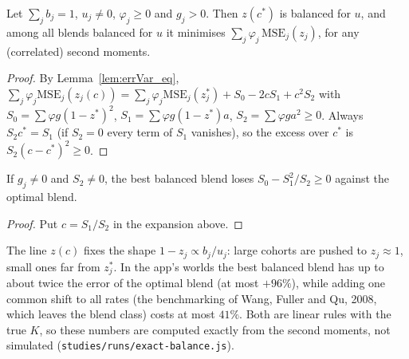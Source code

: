 \begin{theorem}\label{thm:Core_bestBalanced}
  \leanok
  Let $\sum_j b_j = 1$, $u_j \ne 0$, $\varphi_j \ge 0$ and $g_j > 0$. Then
  $z(c^*)$ is balanced for $u$, and among all blends balanced for $u$ it
  minimises $\sum_j\varphi_j\,\mathrm{MSE}_j(z_j)$, for any (correlated)
  second moments.
\end{theorem}
\begin{proof}
  \leanok
  By Lemma~\ref{lem:errVar_eq},
  $\sum_j\varphi_j\mathrm{MSE}_j(z_j(c)) = \sum_j\varphi_j\mathrm{MSE}_j(z_j^*) + S_0 - 2cS_1 + c^2S_2$
  with $S_0 = \sum\varphi g(1 - z^*)^2$, $S_1 = \sum\varphi g(1 - z^*)a$,
  $S_2 = \sum\varphi g a^2 \ge 0$. Always $S_2c^* = S_1$ (if $S_2 = 0$ every
  term of $S_1$ vanishes), so the excess over $c^*$ is $S_2(c - c^*)^2 \ge 0$.
\end{proof}

\begin{corollary}\label{cor:Core_bestBalanced_cost}
  \leanok
  If $g_j \ne 0$ and $S_2 \ne 0$, the best balanced blend loses
  $S_0 - S_1^2/S_2 \ge 0$ against the optimal blend.
\end{corollary}
\begin{proof}
  \leanok
  Put $c = S_1/S_2$ in the expansion above.
\end{proof}

\begin{remark}\label{rem:bestBalanced}
  The line $z(c)$ fixes the shape $1 - z_j \propto b_j/u_j$: large cohorts
  are pushed to $z_j \approx 1$, small ones far from $z_j^*$. In the app's
  worlds the best balanced blend has up to about twice the error of the
  optimal blend (at most $+96\%$), while adding one common shift to all
  rates (the benchmarking of Wang, Fuller and Qu, 2008, which leaves the
  blend class) costs at most $41\%$. Both are linear rules with the true
  $K$, so these numbers are computed exactly from the second moments, not
  simulated (\texttt{studies/runs/exact-balance.js}).
\end{remark}

